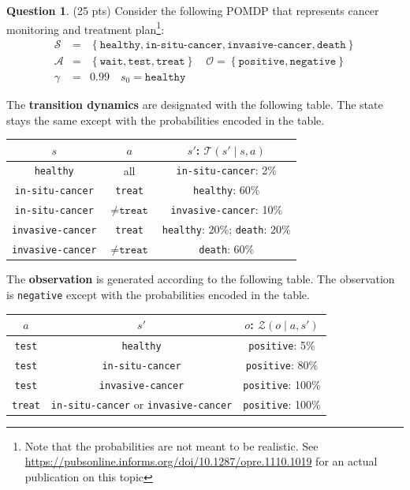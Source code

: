 \documentclass{article}
\theoremstyle{definition}
\newtheorem{question}[thm]{Question}
\newcommand{\ttt}[1]{\texttt{#1}}
\begin{document}
\begin{question}
    (25 pts) Consider the following POMDP that represents cancer monitoring and treatment plan\footnote{Note that the probabilities are not meant to be realistic. See \url{https://pubsonline.informs.org/doi/10.1287/opre.1110.1019} for an actual publication on this topic}:
\begin{eqnarray*}
    \mathcal{S} &=& \left\{\texttt{healthy}, \texttt{in-situ-cancer}, \texttt{invasive-cancer}, \texttt{death}\right\}\\
    \mathcal{A} &=& \left\{\texttt{wait}, \texttt{test}, \texttt{treat}\right\} \quad \mathcal{O} = \left\{\texttt{positive}, \texttt{negative}\right\}\\
    \gamma &=& 0.99 \quad
    s_0 = \texttt{healthy}
\end{eqnarray*}

The \textbf{transition dynamics} are designated with the following table. The state stays the same except with the probabilities encoded in the table.
\begin{center}
\begin{tabular}{ccc}
    \toprule
    $s$ & $a$ & $s'$: $\mathcal{T}(s' \mid s, a)$ \\
    \midrule
    \ttt{healthy} & all & \ttt{in-situ-cancer}: 2\% \\
    \ttt{in-situ-cancer} & \ttt{treat} & \ttt{healthy}: 60\% \\
    \ttt{in-situ-cancer} & $\neq\ttt{treat}$ & \ttt{invasive-cancer}: 10\% \\
    \ttt{invasive-cancer} & \ttt{treat} & \ttt{healthy}: 20\%; \ttt{death}: 20\% \\
    \ttt{invasive-cancer} & $\neq\ttt{treat}$ & \ttt{death}: 60\% \\
    \bottomrule
\end{tabular}
\end{center}

The \textbf{observation} is generated according to the following table. The observation is \ttt{negative} except with the probabilities encoded in the table.
\begin{center}
    \begin{tabular}{ccc}
    \toprule
    $a$ & $s'$ & $o$: $\mathcal{Z}(o \mid a, s')$ \\
    \midrule
    \texttt{test} & \texttt{healthy} & \texttt{positive}: 5\% \\
    \texttt{test} & \texttt{in-situ-cancer} & \texttt{positive}: 80\% \\
    \texttt{test} & \texttt{invasive-cancer} & \texttt{positive}: 100\% \\
    \texttt{treat} & \ttt{in-situ-cancer} or \texttt{invasive-cancer} & \texttt{positive}: 100\% \\
    \bottomrule
    \end{tabular}
\end{center}


\end{question}
\end{document}
